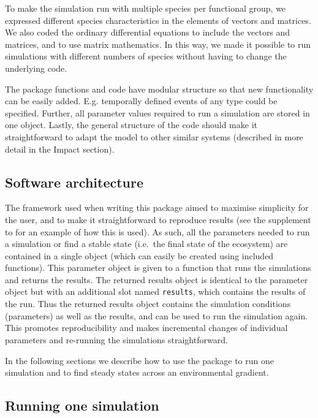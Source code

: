\documentclass[]{elsarticle} %
\begin{document}
To make the simulation run with multiple species per functional group,
we expressed different species characteristics in the elements of
vectors and matrices. We also coded the ordinary differential equations
to include the vectors and matrices, and to use matrix mathematics. In
this way, we made it possible to run simulations with different numbers
of species without having to change the underlying code.

The package functions and code have modular structure so that new
functionality can be easily added. E.g. temporally defined events of any
type could be specified. Further, all parameter values required to run a
simulation are stored in one object. Lastly, the general structure of
the code should make it straightforward to adapt the model to other
similar systems (described in more detail in the Impact section).

\hypertarget{software-architecture}{%
\subsection{Software architecture}\label{software-architecture}}

The framework used when writing this package aimed to maximise
simplicity for the user, and to make it straightforward to reproduce
results (see the supplement \citep{Petchey2022} to \citet{Limberger2022}
for an example of how this is used). As such, all the parameters needed
to run a simulation or find a stable state (i.e.~the final state of the
ecosystem) are contained in a single object (which can easily be created
using included functions). This parameter object is given to a function
that runs the simulations and returns the results. The returned results
object is identical to the parameter object but with an additional slot
named \texttt{results}, which contains the results of the run. Thus the
returned results object contains the simulation conditions (parameters)
as well as the results, and can be used to run the simulation again.
This promotes reproducibility and makes incremental changes of
individual parameters and re-running the simulations straightforward.

In the following sections we describe how to use the package to run one
simulation and to find steady states across an environmental gradient.

\hypertarget{running-one-simulation}{%
\subsection{Running one simulation}\label{running-one-simulation}}
\end{document}
